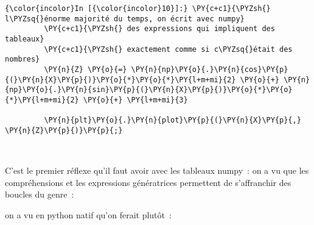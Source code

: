     \begin{Verbatim}[commandchars=\\\{\},frame=single,framerule=0.3mm,rulecolor=\color{cellframecolor}]
{\color{incolor}In [{\color{incolor}10}]:} \PY{c+c1}{\PYZsh{} l\PYZsq{}énorme majorité du temps, on écrit avec numpy}
         \PY{c+c1}{\PYZsh{} des expressions qui impliquent des tableaux}
         \PY{c+c1}{\PYZsh{} exactement comme si c\PYZsq{}était des nombres}
         \PY{n}{Z} \PY{o}{=} \PY{n}{np}\PY{o}{.}\PY{n}{cos}\PY{p}{(}\PY{n}{X}\PY{p}{)}\PY{o}{*}\PY{o}{*}\PY{l+m+mi}{2} \PY{o}{+} \PY{n}{np}\PY{o}{.}\PY{n}{sin}\PY{p}{(}\PY{n}{X}\PY{p}{)}\PY{o}{*}\PY{o}{*}\PY{l+m+mi}{2} \PY{o}{+} \PY{l+m+mi}{3}
         
         \PY{n}{plt}\PY{o}{.}\PY{n}{plot}\PY{p}{(}\PY{n}{X}\PY{p}{,} \PY{n}{Z}\PY{p}{)}\PY{p}{;}
\end{Verbatim}


    \begin{center}
    \end{center}
    { \hspace*{\fill} \\}
    
    C'est le premier réflexe qu'il faut avoir avec les tableaux numpy~: on a
vu que les compréhensions et les expressions génératrices permettent de
s'affranchir des boucles du genre~:

\begin{Shaded}
\begin{Highlighting}[frame=lines,framerule=0.6mm,rulecolor=\color{asisframecolor}]
\OperatorTok{=}\NormalTok{ []}
\end{Highlighting}
\end{Shaded}

on a vu en python natif qu'on ferait plutôt~:

\begin{Shaded}
\begin{Highlighting}[frame=lines,framerule=0.6mm,rulecolor=\color{asisframecolor}]
\OperatorTok{=}
\end{Highlighting}
\end{Shaded}

